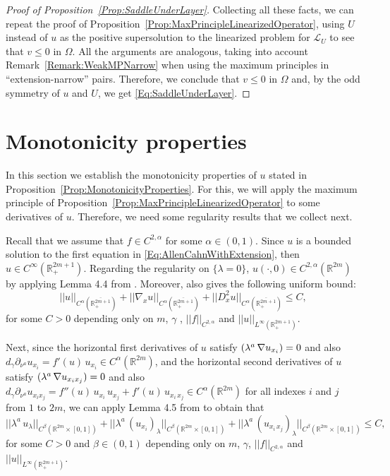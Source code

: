 \documentclass[12pt,reqno]{amsart}
\theoremstyle{definition}
\theoremstyle{remark}
\newcommand{\con}[1]{\mathbb{#1}}
\newcommand{\R}{\con{R}} %
\newcommand{\s}{\gamma}
\let\div\relax
\DeclareMathOperator{\div}{div}
\numberwithin{equation}{section}
\begin{document}
\begin{proof}[Proof of Proposition~\ref{Prop:SaddleUnderLayer}]
Collecting all these facts, we can repeat the proof of Proposition~\ref{Prop:MaxPrincipleLinearizedOperator}, using $U$ instead of $u$ as the positive supersolution to the linearized problem for $\mathscr{L}_U$ to see that $v\leq 0$ in $\Omega$. All the arguments are analogous, taking into account Remark~\ref{Remark:WeakMPNarrow} when using the maximum principles in ``extension-narrow'' pairs. Therefore, we conclude that $v\leq 0$ in $\Omega$ and, by the odd symmetry of $u$ and $U$, we get \eqref{Eq:SaddleUnderLayer}.
\end{proof}



\section{Monotonicity properties}
\label{Sec:Monotonicity}

In this section we establish the monotonicity properties of $u$ stated in Proposition~\ref{Prop:MonotonicityProperties}. For this, we will apply the maximum principle of Proposition~\ref{Prop:MaxPrincipleLinearizedOperator} to some derivatives of $u$. Therefore, we need some regularity results that we collect next. 

Recall that we assume that $f\in C^{2,\alpha}$ for some $\alpha\in(0,1)$. Since $u$ is a bounded solution to the first equation in \eqref{Eq:AllenCahnWithExtension}, then $u\in C^\infty(\R^{2m+1}_+)$. Regarding the regularity on $\{\lambda = 0\}$, $u(\cdot,0)\in C^{2,\alpha}(\R^{2m})$ by applying Lemma 4.4 from \cite{CabreSireI}. Moreover, \cite{CabreSireI} also gives the following uniform bound:
$$ 
||u||_{C^\alpha\left(\overline{\R^{2m+1}_+}\right)} + ||\nabla_x u||_{C^\alpha\left(\overline{\R^{2m+1}_+}\right)} + ||D^2_x u||_{C^\alpha\left(\overline{\R^{2m+1}_+}\right)} \leq C, 
$$
for some $C>0$ depending only on $m$, $\s$ , $||f||_{C^{2,\alpha}}$ and $||u||_{L^\infty(\R^{2m+1}_+)}$.

Next, since the horizontal first derivatives of $u$ satisfy $\div(\lambda^a \, \nabla u_{x_i}) = 0$ and also $d_\s \partial_{\nu^a}  u_{x_i} = f'(u) \,u_{x_i} \in C^\alpha(\R^{2m})$, and the  horizontal second derivatives of $u$ satisfy $\div(\lambda^a \, \nabla u_{x_i x_j}) = 0$ and also  $d_\s\partial_{\nu^a} u_{x_i x_j} = f''(u) \,u_{x_i}\,u_{x_j} + f'(u) \, u_{x_i\,x_j}\in C^\alpha(\R^{2m})$ for all indexes $i$ and $j$ from $1$ to $2m$, we can apply Lemma 4.5 from \cite{CabreSireI} to obtain that
$$
||\lambda^a \, u_\lambda||_{C^\beta\left(\R^{2m}\times [0,1]\right)} + ||\lambda^a \, (u_{x_i})_\lambda||_{C^\beta\left(\R^{2m}\times [0,1]\right)}  + ||\lambda^a \, (u_{x_i\,x_j})_\lambda||_{C^\beta\left(\R^{2m}\times [0,1]\right)} \leq C,
$$
for some $C>0$ and $\beta\in(0,1)$ depending only on $m$, $\s$, $||f||_{C^{2,\alpha}}$ and $||u||_{L^\infty(\R^{2m+1}_+)}$.
\end{document}
